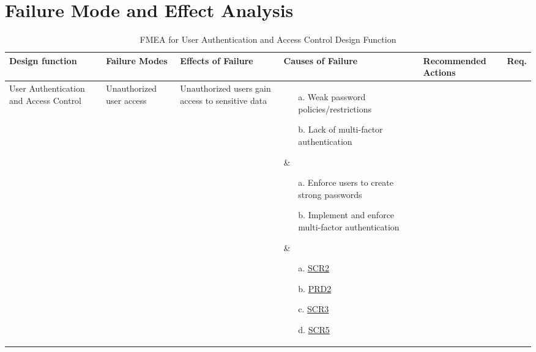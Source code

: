 \documentclass{article}
\begin{document}
\section{Failure Mode and Effect Analysis}

\begin{landscape}


\begin{table}
\centering
\caption{FMEA for User Authentication and Access Control Design Function}
\begin{tabular}{|p{2.5cm}|p{3cm}|p{3cm}|p{5cm}|p{5cm}|p{2cm}|}
\hline
\rowcolor{lightgray}
\textbf{Design function} & \textbf{Failure Modes} & \textbf{Effects of Failure} & \textbf{Causes of Failure} & \textbf{Recommended Actions} & \textbf{Req.} \\ \hline

\parbox[t]{2.5cm}{\raggedright User Authentication and Access Control} & \parbox[t]{3cm}{\raggedright Unauthorized user access} & \parbox[t]{3cm}{\raggedright Unauthorized users gain access to sensitive data} &
\parbox[t]{5cm}{\raggedright
    \begin{enumerate}
      \item[a.] Weak password policies/restrictions
      \item[b.] Lack of multi-factor authentication
    \end{enumerate}
  } &
\parbox[t]{5cm}{\raggedright
    \begin{enumerate}
        \item[a.] Enforce users to create strong passwords
        \item[b.] Implement and enforce multi-factor authentication
    \end{enumerate}
} &

\parbox[t]{2cm}{\raggedright
    \begin{enumerate}
        \item[a.] \href{https://github.com/ausbennett/mes-finance-platform/blob/main/docs/SRS/SRS.tex\#L715}{SCR2}
        \item[b.] \href{https://github.com/ausbennett/mes-finance-platform/blob/main/docs/SRS/SRS.tex\#L662}{PRD2}
        \item[c.] \href{https://github.com/ausbennett/mes-finance-platform/blob/main/docs/SRS/SRS.tex\#L716}{SCR3}
        \item[d.] \href{https://github.com/ausbennett/mes-finance-platform/blob/main/docs/SRS/SRS.tex\#L718}{SCR5}
    \end{enumerate}
}
\\ \hline


\end{tabular}
\end{table}
\end{landscape}
\end{document}
